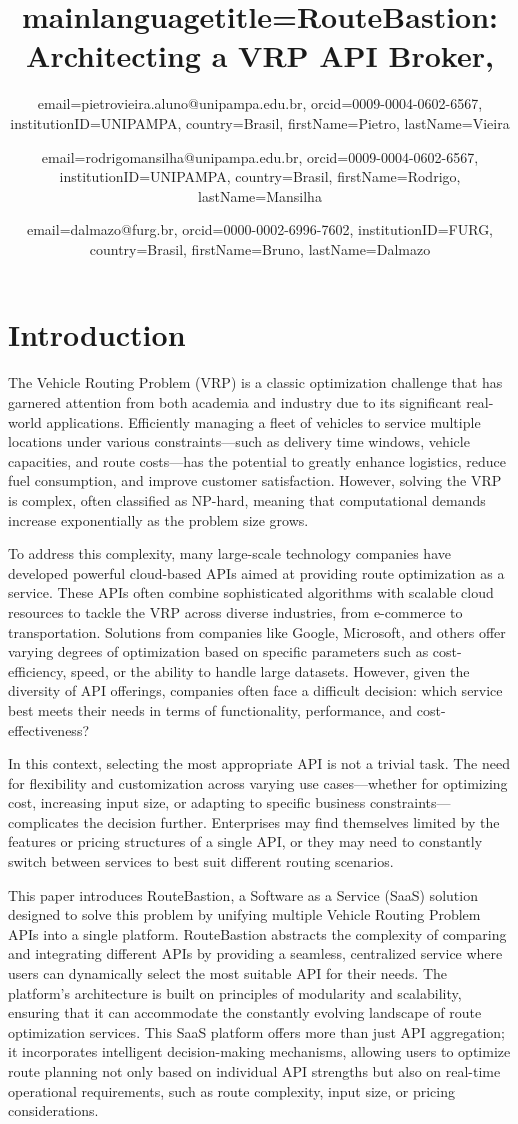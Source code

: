 \documentclass[english,notblind]{sbc20}
\title
  {
    mainlanguagetitle={RouteBastion: Architecting a VRP API Broker},
  }
\author
  {
    email=pietrovieira.aluno@unipampa.edu.br,
    orcid=0009-0004-0602-6567,
    institutionID=UNIPAMPA,
    country=Brasil,
    firstName=Pietro,
    lastName=Vieira 
  }
\author
  {
    email=rodrigomansilha@unipampa.edu.br,
    orcid=0009-0004-0602-6567, %
    institutionID=UNIPAMPA,
    country=Brasil,
    firstName=Rodrigo,
    lastName=Mansilha 
  }
\author
  {
    email=dalmazo@furg.br,
    orcid=0000-0002-6996-7602,
    institutionID=FURG,
    country=Brasil,
    firstName=Bruno,
    lastName=Dalmazo 
  }
\begin{document}
\maketitle

\section{Introduction}
\label{sec:intro}

The Vehicle Routing Problem (VRP) is a classic optimization challenge that has garnered attention from both academia and industry due to its significant real-world applications. Efficiently managing a fleet of vehicles to service multiple locations under various constraints—such as delivery time windows, vehicle capacities, and route costs—has the potential to greatly enhance logistics, reduce fuel consumption, and improve customer satisfaction. However, solving the VRP is complex, often classified as NP-hard, meaning that computational demands increase exponentially as the problem size grows.

To address this complexity, many large-scale technology companies have developed powerful cloud-based APIs aimed at providing route optimization as a service. These APIs often combine sophisticated algorithms with scalable cloud resources to tackle the VRP across diverse industries, from e-commerce to transportation. Solutions from companies like Google, Microsoft, and others offer varying degrees of optimization based on specific parameters such as cost-efficiency, speed, or the ability to handle large datasets. However, given the diversity of API offerings, companies often face a difficult decision: which service best meets their needs in terms of functionality, performance, and cost-effectiveness?

In this context, selecting the most appropriate API is not a trivial task. The need for flexibility and customization across varying use cases—whether for optimizing cost, increasing input size, or adapting to specific business constraints—complicates the decision further. Enterprises may find themselves limited by the features or pricing structures of a single API, or they may need to constantly switch between services to best suit different routing scenarios.

This paper introduces RouteBastion, a Software as a Service (SaaS) solution designed to solve this problem by unifying multiple Vehicle Routing Problem APIs into a single platform. RouteBastion abstracts the complexity of comparing and integrating different APIs by providing a seamless, centralized service where users can dynamically select the most suitable API for their needs. The platform’s architecture is built on principles of modularity and scalability, ensuring that it can accommodate the constantly evolving landscape of route optimization services. This SaaS platform offers more than just API aggregation; it incorporates intelligent decision-making mechanisms, allowing users to optimize route planning not only based on individual API strengths but also on real-time operational requirements, such as route complexity, input size, or pricing considerations.
\end{document}
